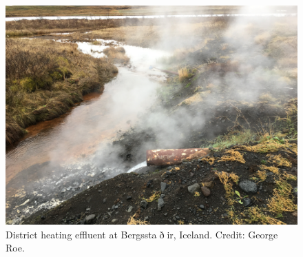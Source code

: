\begin{figure}[h]
	\centering

	\includegraphics[width=\textwidth]{figures/BergstadirEffluent.jpg} 

	\caption{District heating effluent at Bergssta$\eth$ir, Iceland. Credit: George Roe.}
	\label{fig:bergstadir_effluent}

\end{figure}